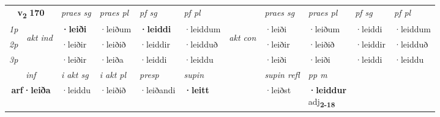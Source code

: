 \noindent
\begin{tabular}{lllllllllll} \toprule
\multicolumn{2}{c}{\textbf{v{\textsubscript{2}}} \Large{\textbf{170}}}  &  \textit{praes sg}  & \textit{praes pl}  &\textit{ pf sg} & \textit{pf pl} &  &  \textit{praes sg}  & \textit{praes pl}  & \textit{pf sg} & \textit{pf pl } \\*
	\cmidrule{3-6} \cmidrule{8-11}
 {\textit{1p}} & \multirow{3}{*}{\begin{turn}{90}\textit{akt ind}\end{turn}} & \textbf{·leiði} & ·leiðum & \textbf{·leiddi} & ·leiddum & \multirow{3}{*}{\begin{turn}{90}\textit{akt con}\end{turn}} &·leiði & ·leiðum & ·leiddi & ·leiddum\\*
 {\textit{2p}} &  &  ·leiðir  & ·leiðið & ·leiddir & ·leidduð & & ·leiðir & ·leiðið & ·leiddir & ·leidduð \\*
{\textit{3p}} &  & ·leiðir & ·leiða & ·leiddi & ·leiddu & & ·leiði & ·leiði& ·leiddi & ·leiddu \\*
\cmidrule{3-6} \cmidrule{8-11}

   \multicolumn{2}{c}{\textit{inf}}  & \textit{i akt sg} & \textit{i akt pl}   & \textit{presp} & \textit{supin} && \textit{supin refl} & \textit{pp m} \\*
  \multicolumn{2}{c}{\textbf{arf\allowbreak ·leiða}} & ·leiddu  & ·leiðið   & ·leiðandi &  \textbf{·leitt} && ·leiðst & \specialcell{\textbf{·leiddur} \\ adj\textbf{\textsubscript{2-18}}} \\*
\end{tabular}

